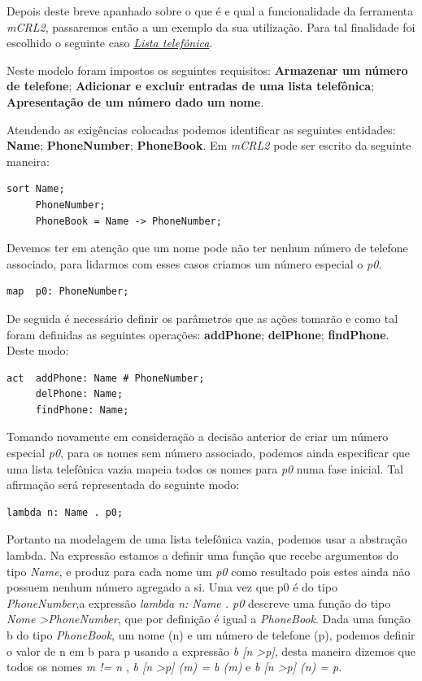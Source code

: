 \documentclass[11pt,a4paper]{report}
\begin{document}
Depois deste breve apanhado sobre o que é e qual a funcionalidade da ferramenta \emph{mCRL2}, passaremos então a um exemplo da sua utilização. Para tal finalidade foi escolhido o seguinte caso \emph{\href{www.mcrl2.org/web/user_manual/tutorial/phonebook/index.html}{Lista telefônica}}.

Neste modelo foram impostos os seguintes requisitos:  \textbf{Armazenar um número de telefone}; \textbf{Adicionar e excluir entradas de uma lista telefônica}; \textbf{Apresentação de um número dado um nome}.

Atendendo as exigências colocadas podemos identificar as seguintes entidades: \textbf{Name}; \textbf{PhoneNumber}; \textbf{PhoneBook}. Em \emph{mCRL2} pode ser escrito da seguinte maneira:

\begin{lstlisting}
sort Name;
     PhoneNumber;
     PhoneBook = Name -> PhoneNumber;
\end{lstlisting}

Devemos ter em atenção que um nome pode não ter nenhum número de telefone associado, para lidarmos com esses casos criamos um número especial o \emph{p0}.

\begin{lstlisting}
map  p0: PhoneNumber; 
\end{lstlisting}

De seguida é necessário definir os parâmetros que as ações tomarão e como tal foram definidas as seguintes operações: \textbf{addPhone}; \textbf{delPhone}; \textbf{findPhone}. Deste modo:

\begin{lstlisting}
act  addPhone: Name # PhoneNumber;
     delPhone: Name;
     findPhone: Name;
\end{lstlisting}

\newpage
Tomando novamente em consideração a decisão anterior de criar um número especial \emph{p0}, para os nomes sem número associado, podemos ainda especificar que uma lista telefônica vazia mapeia todos os nomes para \emph{p0} numa fase inicial. Tal afirmação será representada do seguinte modo:

\begin{lstlisting}
lambda n: Name . p0;
\end{lstlisting}

Portanto na modelagem de uma lista telefônica vazia, podemos usar a abstração lambda. Na expressão estamos a definir uma função que recebe argumentos do tipo \emph{Name}, e produz para cada nome um \emph{p0} como resultado pois estes ainda não possuem nenhum número agregado a si. Uma vez que p0 é do tipo \emph{PhoneNumber},a expressão \emph{lambda n: Name . p0} descreve uma função do tipo \emph{Nome \textendash\textgreater PhoneNumber}, que por definição é igual a \emph{PhoneBook}. Dada uma função b do tipo \emph{PhoneBook}, um nome (n) e um número de telefone (p), podemos definir o valor de n em b para p usando a expressão \emph{b [n \textendash\textgreater p]}, desta maneira dizemos que todos os nomes \emph{m != n} , \emph{b [n \textendash\textgreater p] (m) = b (m)} e \emph{b [n \textendash\textgreater p] (n) = p}. 
\end{document}
